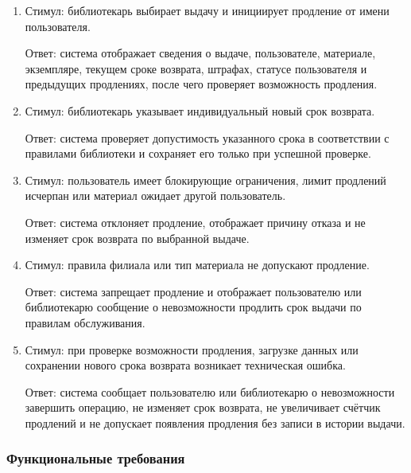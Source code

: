 \documentclass[12pt,a4paper]{article}
\begin{document}
\begin{enumerate}
		Ответ: система отображает список найденных активных выдач и позволяет
		библиотекарю выбрать нужную выдачу.
		
		\item Стимул: библиотекарь выбирает выдачу и инициирует продление от имени
		пользователя.
		
		Ответ: система отображает сведения о выдаче, пользователе, материале,
		экземпляре, текущем сроке возврата, штрафах, статусе пользователя и предыдущих
		продлениях, после чего проверяет возможность продления.
		
		\item Стимул: библиотекарь указывает индивидуальный новый срок возврата.
		
		Ответ: система проверяет допустимость указанного срока в соответствии
		с правилами библиотеки и сохраняет его только при успешной проверке.
		
		\item Стимул: пользователь имеет блокирующие ограничения, лимит продлений
		исчерпан или материал ожидает другой пользователь.
		
		Ответ: система отклоняет продление, отображает причину отказа и не изменяет
		срок возврата по выбранной выдаче.
		
		\item Стимул: правила филиала или тип материала не допускают продление.
		
		Ответ: система запрещает продление и отображает пользователю или библиотекарю
		сообщение о невозможности продлить срок выдачи по правилам обслуживания.
		
		\item Стимул: при проверке возможности продления, загрузке данных или сохранении
		нового срока возврата возникает техническая ошибка.
		
		Ответ: система сообщает пользователю или библиотекарю о невозможности
		завершить операцию, не изменяет срок возврата, не увеличивает счётчик продлений
		и не допускает появления продления без записи в истории выдачи.
	\end{enumerate}
	
	\subsubsection{Функциональные требования}
	
\end{document}
